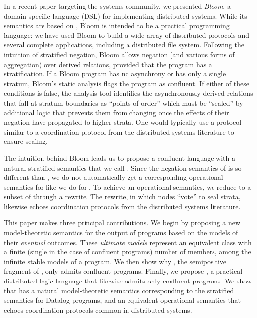 In a recent paper targeting the systems community, we presented \emph{Bloom}, a domain-specific language (DSL) for implementing distributed 
systems.  While its semantics are based on \lang, Bloom is intended to be a practical programming language: we have used Bloom to build a wide array of distributed protocols and several complete
applications, including a distributed file system.
Following the intuition of stratified negation, Bloom allows negation (and various forms of aggregation) over derived relations, provided that the program has a stratification.
If a Bloom program has no asynchrony or has only a single stratum, Bloom's static analysis flags the 
program as confluent.  If either of these conditions is false, the analysis tool identifies the asynchronously-derived relations that fall 
at stratum boundaries as ``points of order'' which must be ``sealed'' by additional logic that prevents them from changing once the effects 
of their negation have propagated to higher strata.  One would typically use a protocol similar to a coordination protocol from the distributed systems literature to ensure sealing.

The intuition behind Bloom leads us to propose a confluent language with a natural stratified semantics that we call \plang.  Since the negation semantics of \plang is so different than \lang, we do not automatically get a corresponding operational semantics for \plang like we do for \slang.  To achieve an operational semantics, we reduce \plang to a subset of \lang through a rewrite.  The rewrite, in which nodes ``vote'' to seal strata, likewise echoes coordination protocols from the distributed systems literature.

This paper makes three principal contributions.  We begin by proposing a new model-theoretic semantics for the output of \dedalus 
programs based on the models of their \emph{eventual} outcomes.  These \emph{ultimate models} represent an equivalent class with a finite (single in the case of confluent 
programs) number of members, among the infinite stable models of a \lang program.  We then show why \slang, the semipositive fragment of \lang, only admits confluent programs.  Finally, we propose \plang, a practical distributed logic language that likewise admits only confluent programs.
We show that \plang has a natural model-theoretic semantics corresponding to the stratified semantics for Datalog programs, and an equivalent operational semantics that echoes coordination protocols common in distributed systems.

